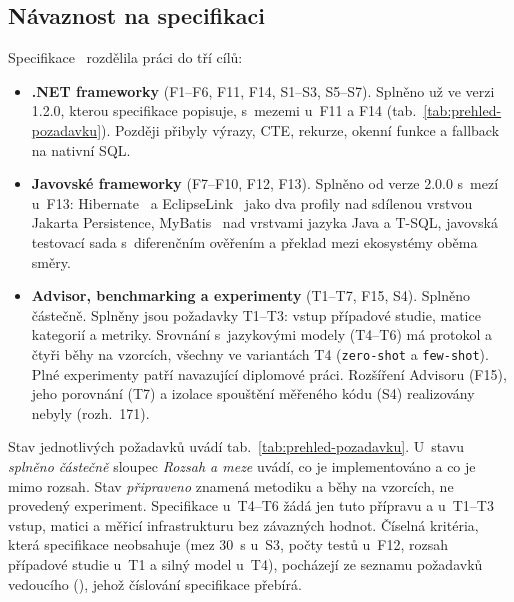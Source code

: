 \subsection{Návaznost na specifikaci}

Specifikace~\cite{spec} rozdělila práci do tří cílů:

\begin{itemize}[leftmargin=*,itemsep=1pt]
\item \textbf{.NET frameworky} (F1--F6, F11, F14, S1--S3, S5--S7). Splněno už ve verzi 1.2.0, kterou specifikace popisuje, s~mezemi u~F11 a F14 (tab.~\ref{tab:prehled-pozadavku}). Později přibyly výrazy, CTE, rekurze, okenní funkce a fallback na nativní SQL.
\item \textbf{Javovské frameworky} (F7--F10, F12, F13). Splněno od verze 2.0.0 s~mezí u~F13: Hibernate~\cite{hibernate-docs} a EclipseLink~\cite{eclipselink-docs} jako dva profily nad sdílenou vrstvou Jakarta Persistence, MyBatis~\cite{mybatis-docs} nad vrstvami jazyka Java a T-SQL, javovská testovací sada s~diferenčním ověřením a překlad mezi ekosystémy oběma směry.
\item \textbf{Advisor, benchmarking a experimenty} (T1--T7, F15, S4). Splněno částečně. Splněny jsou požadavky T1--T3: vstup případové studie, matice kategorií a metriky. Srovnání s~jazykovými modely (T4--T6) má protokol a čtyři běhy na vzorcích, všechny ve variantách T4 (\texttt{zero-shot} a \texttt{few-shot}). Plné experimenty patří navazující diplomové práci. Rozšíření Advisoru (F15), jeho porovnání (T7) a izolace spouštění měřeného kódu (S4) realizovány nebyly (rozh.~171).
\end{itemize}

Stav jednotlivých požadavků uvádí tab.~\ref{tab:prehled-pozadavku}. U~stavu \emph{splněno částečně} sloupec \emph{Rozsah a meze} uvádí, co je implementováno a co je mimo rozsah. Stav \emph{připraveno} znamená metodiku a běhy na vzorcích, ne provedený experiment. Specifikace u~T4--T6 žádá jen tuto přípravu a u~T1--T3 vstup, matici a měřicí infrastrukturu bez závazných hodnot. Číselná kritéria, která specifikace neobsahuje (mez 30~s u~S3, počty testů u~F12, rozsah případové studie u~T1 a silný model u~T4), pocházejí ze seznamu požadavků vedoucího (), jehož číslování specifikace přebírá.

